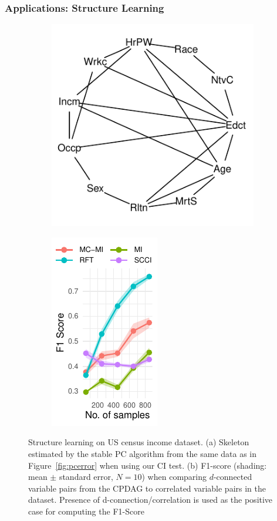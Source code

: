 \documentclass{beamer}
\begin{document}
\begin{frame}
	\frametitle{Applications: Structure Learning}
	\begin{figure}
		\centering
		\begin{subfigure}{0.3\textwidth}
			\centering
			\includegraphics[scale=0.85]{imgs/sl-adult-rf.pdf}
			\caption{}
			\label{fig:sl_adult_model}
		\end{subfigure}%
		\begin{subfigure}{0.2\textwidth}
			\centering
			\includegraphics{imgs/adult_F1.pdf}
			\caption{}
			\label{fig:sl_adult}
		\end{subfigure}
		\caption{Structure learning on US census income dataset. (a)
		Skeleton estimated by the stable PC algorithm from the same
		data as in Figure~\ref{fig:pcerror} when using our CI test. (b)
		F1-score (shading: mean $\pm$ standard error, $N=10$) when
		comparing $d$-connected variable pairs from the CPDAG to
		correlated variable pairs in the dataset. Presence of
		d-connection/correlation is used as the positive case for
		computing the F1-Score}
	\end{figure}
\end{frame}
\end{document}

